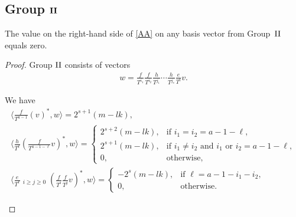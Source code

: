 \subsection[Group ${\rm II}$]{Group $\boldsymbol{{\rm II}}$}\label{subsec group 2}
\begin{prop}\label{Pr2}The value on the right-hand side of \eqref{AA} on any basis vector from Group~${\rm II}$ equals zero.
\end{prop}
\begin{proof}Group ${\rm II}$ consists of vectors
\begin{gather*}
w=\frac{f}{T^{i_1}}\frac{f}{T^{i_2}}\frac{h}{T^{j_1}} \cdots \frac{h}{T^{j_s}} \frac{e}{T^l}v.
\end{gather*}

\begin{lem}\label{Group 2} We have
\begin{gather}
\bigg\langle \frac{f}{T^{a-1}} (v)^*, w \bigg\rangle = 2^{s+1} (m - lk), \label{G21} \\
\bigg\langle \frac{h}{T^{\ell}} \left(\frac{f}{T^{a-1-\ell}}v\right)^*, w \bigg\rangle =
 \begin{cases}
 2^{s+2} (m - lk), & \text{if $i_1 = i_2 = a-1-\ell$},\\
 2^{s+1} (m - lk), & \text{if $i_1 \ne i_2$ and $i_{1}$ or $i_2 = a-1-\ell$}, \\
 0, & \text{otherwise},
 \end{cases} \label{G22} \\
\bigg\langle \frac{e}{T^{\ell}}
\mathop{\sum_{i+j=a-1-\ell}}_{i\geq j\geq 0} \left(\frac{f}{T^i}\frac{f}{T^j}v\right)^*, w \bigg\rangle =
 \begin{cases}
 - 2^{s} (m - lk), & \text{if $\ell = a-1 - i_1 - i_2$},\\
 0, & \text{otherwise}.
 \end{cases} \label{G23}
\end{gather}
\end{lem}


\end{proof}
